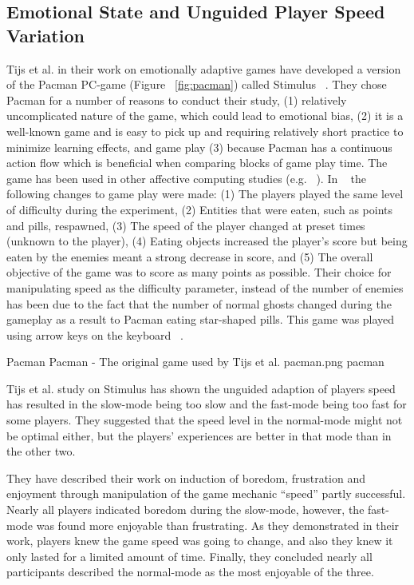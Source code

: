 \subsection{Emotional State and Unguided Player Speed Variation}
Tijs et al. in their work on emotionally adaptive games have developed a version of the Pacman PC-game (Figure ~\ref{fig:pacman}) called Stimulus ~\cite{tijs2009creating}. They chose Pacman for a number of reasons to conduct their study, (1) relatively uncomplicated nature of the game, which could lead to emotional bias, (2) it is a well-known game and is easy to pick up and requiring relatively short practice to minimize learning effects, and game play (3) because Pacman has a continuous action flow which is beneficial when comparing blocks of game play time. The game has been used in other affective computing studies (e.g. ~\cite{yannakakis2007towards}). In ~\cite{tijs2009creating} the following changes to game play were made: (1) The players played the same level of difficulty during the experiment, (2) Entities that were eaten, such as points and pills, respawned, (3) The speed of the player changed at preset times (unknown to the player), (4) Eating objects increased the player's score but being eaten by the enemies meant a strong decrease in score, and (5) The overall objective of the game was to score as many points as possible. Their choice for manipulating speed as the difficulty parameter, instead of the number of enemies has been due to the fact that the number of normal ghosts changed during the gameplay as a result to Pacman eating star-shaped pills. This game was played using arrow keys on the keyboard ~\cite{tijs2009creating}.

\img
{Pacman}
{Pacman - The original game used by Tijs et al.}
{pacman.png}
{pacman}

Tijs et al. study on Stimulus has shown the unguided adaption of players speed has resulted in the slow-mode being too slow and the fast-mode being too fast for some players. They suggested that the speed level in the normal-mode might not be optimal either, but the players' experiences are better in that mode than in the other two.

They have described their work on induction of boredom, frustration and enjoyment through manipulation of the game mechanic ``speed'' partly successful. Nearly all players indicated boredom during the slow-mode, however, the fast-mode was found more enjoyable than frustrating. As they demonstrated in their work, players knew the game speed was going to change, and also they knew it only lasted for a limited amount of time. Finally, they concluded nearly all participants described the normal-mode as the most enjoyable of the three.

